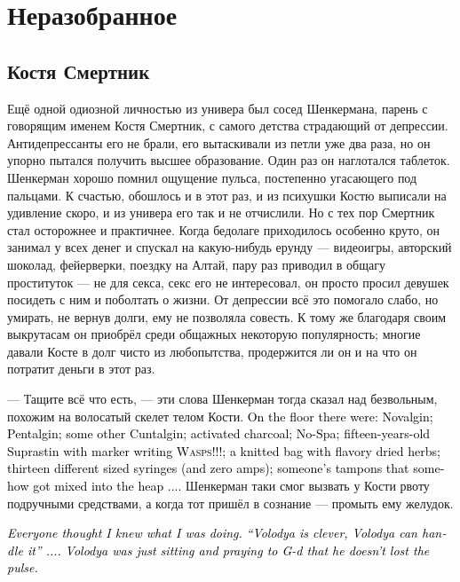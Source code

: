 \documentclass[a4paper,10pt,fleqn]{book}\usepackage{polyglossia}\setdefaultlanguage{english}\setotherlanguage{russian}\defaultfontfeatures{Ligatures=TeX,Mapping=tex-text} \usepackage{xcolor}\definecolor{lightgray}{HTML}{bbbbbb}\color{lightgray}\newcommand{\ml}[3]{\textcolor{black}{#3}}
\begin{document}
\chapter{Неразобранное}

\section{Костя Смертник}

Ещё одной одиозной личностью из универа был сосед Шенкермана, парень с говорящим именем Костя Смертник, с самого детства страдающий от депрессии.
Антидепрессанты его не брали, его вытаскивали из петли уже два раза, но он упорно пытался получить высшее образование.
Один раз он наглотался таблеток.
Шенкерман хорошо помнил ощущение пульса, постепенно угасающего под пальцами.
К счастью, обошлось и в этот раз, и из психушки Костю выписали на удивление скоро, и из универа его так и не отчислили.
Но с тех пор Смертник стал осторожнее и практичнее.
Когда бедолаге приходилось особенно круто, он занимал у всех денег и спускал на какую-нибудь ерунду --- видеоигры, авторский шоколад, фейерверки, поездку на Алтай, пару раз приводил в общагу проституток --- не для секса, секс его не интересовал, он просто просил девушек посидеть с ним и поболтать о жизни.
От депрессии всё это помогало слабо, но умирать, не вернув долги, ему не позволяла совесть.
К тому же благодаря своим выкрутасам он приобрёл среди общажных некоторую популярность;
многие давали Косте в долг чисто из любопытства, продержится ли он и на что он потратит деньги в этот раз.

--- Тащите всё что есть, --- эти слова Шенкерман тогда сказал над безвольным, похожим на волосатый скелет телом Кости.
\ml{$0$}
{На пол посыпались таблетки анальгина, пенталгина, ещё какого-то хуелгина, активированный уголь, ношпа, супрастин пятнадцатилетней давности с надписью маркером <<ОСЫ!!!>>, вязаный мешочек с пахучей сушёной травой,
 тринадцать разнокалиберных шприцов (и ни одной ампулы), чьи-то случайно затесавшиеся тампоны...}
{On the floor there were: Novalgin; Pentalgin; some other Cuntalgin; activated charcoal; No-Spa; fifteen-years-old Suprastin with marker writing \textsc{Wasps!!!}; a knitted bag with flavory dried herbs; thirteen different sized syringes (and zero amps); someone's tampons that somehow got mixed into the heap ....}
Шенкерман таки смог вызвать у Кости рвоту подручными средствами, а когда тот пришёл в сознание --- промыть ему желудок.

\ml{$0$}
{<<Все думали, что я знаю, что делаю, что у меня всё под контролем.}
{\textit{Everyone thought I knew what I was doing.}}
\ml{$0$}
{,,Володя умный, Володя разберётся``...}
{\textit{``Volodya is clever, Volodya can handle it'' ....}}
\ml{$0$}
{А Володя просто сидел и молился Б-гу, чтобы пульс не пропал>>.}
{\textit{Volodya was just sitting and praying to G-d that he doesn't lost the pulse.}}
\end{document}
